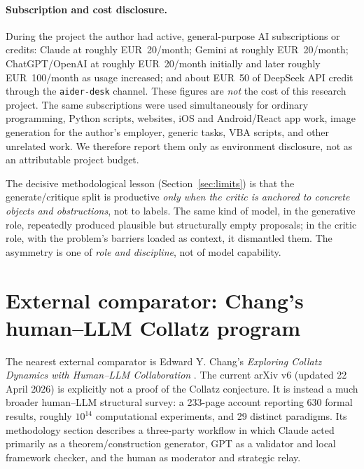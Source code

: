 \documentclass[11pt,a4paper]{article}
\theoremstyle{definition}
\begin{document}
\paragraph{Subscription and cost disclosure.}
During the project the author had active, general-purpose AI subscriptions or
credits: Claude at roughly EUR~20/month; Gemini at roughly EUR~20/month;
ChatGPT/OpenAI at roughly EUR~20/month initially and later roughly
EUR~100/month as usage increased; and about EUR~50 of DeepSeek API credit
through the \texttt{aider-desk} channel. These figures are \emph{not} the
cost of this research project. The same subscriptions were used
simultaneously for ordinary programming, Python scripts, websites, iOS and
Android/React app work, image generation for the author's employer, generic
tasks, VBA scripts, and other unrelated work. We therefore report them only
as environment disclosure, not as an attributable project budget.

The decisive methodological lesson (Section~\ref{sec:limits}) is that the
generate/critique split is productive \emph{only when the critic is anchored
to concrete objects and obstructions}, not to labels. The same kind of model,
in the generative role, repeatedly produced plausible but structurally empty
proposals; in the critic role, with the problem's barriers loaded as context,
it dismantled them. The asymmetry is one of \emph{role and discipline}, not of
model capability.

\section{External comparator: Chang's human--LLM Collatz program}
\label{sec:chang}

The nearest external comparator is Edward Y. Chang's \emph{Exploring
Collatz Dynamics with Human--LLM Collaboration} \cite{chang2026}. The
current arXiv v6 (updated 22 April 2026) is explicitly not a proof of the
Collatz conjecture. It is instead a much broader human--LLM structural
survey: a 233-page account reporting 630 formal results, roughly
$10^{14}$ computational experiments, and 29 distinct paradigms. Its
methodology section describes a three-party workflow in which Claude acted
primarily as a theorem/construction generator, GPT as a validator and local
framework checker, and the human as moderator and strategic relay.
\end{document}
